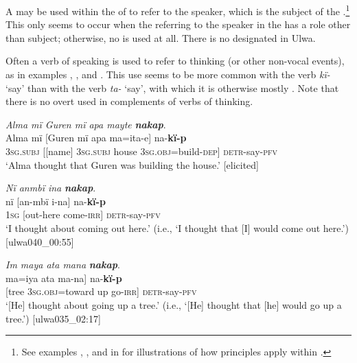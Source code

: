   A   may be used within the  of  to refer to the speaker, which is the subject of the .\footnote{See examples , , and  in  for illustrations of how  principles apply within .} This only seems to occur when the  referring to the speaker in the  has a role other than subject; otherwise, no  is used at all. There is no designated  in Ulwa.

  Often a verb of speaking is used to refer to thinking (or other non-vocal events), as in examples , , and . This use seems to be more common with the verb \textit{kï-} ‘say’ than with the verb \textit{ta-} ‘say’, with which it is otherwise mostly . Note that there is no overt  used in complements of verbs of thinking.

\ea%
    \label{ex:syntax:236}
          \textit{Alma mï Guren mï apa mayte} \textbf{\textit{nakap}}.\\
\gll Alma  mï      {[Guren}    mï      apa    {ma=ita-e]}  na-\textbf{kï-p}\\
    [name]  3\textsc{sg.subj}  [[name]  3\textsc{sg.subj}  house  3\textsc{sg.obj}=build-\textsc{dep]}     \textsc{detr-}say-\textsc{pfv}\\
\glt `Alma thought that Guren was building the house.’ [elicited]
\z

\ea%
    \label{ex:syntax:237}
          \textit{Nï anmbï ina} \textbf{\textit{nakap}}.\\
\gll nï    [an-mbï  i-na]    na-\textbf{kï-p}\\
    1\textsc{sg}  [out-here  come-\textsc{irr]}  \textsc{detr-}say-\textsc{pfv}\\
\glt `I thought about coming out here.’ (i.e., ‘I thought that [I] would come out here.’) [ulwa040\_00:55]
\z

\ea%
    \label{ex:syntax:238}
          \textit{Im maya ata mana} \textbf{\textit{nakap}}.\\
\gll {[im}    ma=iya      ata  {ma-na]}    na-\textbf{kï-p}\\
    {[tree}  3\textsc{sg.obj=}toward  up  go-\textsc{irr]}  \textsc{detr-}say-\textsc{pfv}\\
\glt `[He] thought about going up a tree.’ (i.e., ‘[He] thought that [he] would go up a tree.’) [ulwa035\_02:17]
\z

